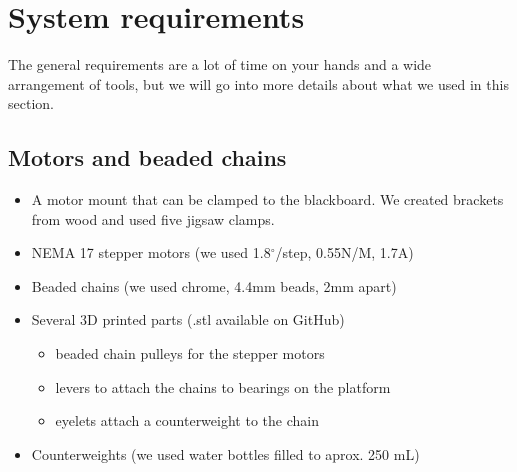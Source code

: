 \documentclass[a4paper,10pt]{article}
\begin{document}
\clearpage
\section{System requirements}
\label{sec:sysreq}
The general requirements are a lot of time on your hands and a wide
arrangement of tools, but we will go into more details about what
we used in this section.

\subsection*{Motors and beaded chains}
\begin{itemize}
  \item A motor mount that can be clamped to the blackboard. We created brackets from wood and used five jigsaw clamps.
  \item NEMA 17 stepper motors (we used 1.8$^\circ$/step, 0.55N/M, 1.7A)
  \item Beaded chains (we used chrome, 4.4mm beads, 2mm apart)
  \item Several 3D printed parts (.stl available on GitHub)
  \begin{itemize}
    \item beaded chain pulleys for the stepper motors
    \item levers to attach the chains to bearings on the platform
    \item eyelets attach a counterweight to the chain
  \end{itemize}
  \item Counterweights (we used water bottles filled to aprox. 250 mL)
\end{itemize}
\end{document}
